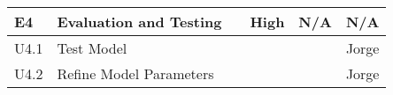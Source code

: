 \begin{longtable}[h!]{|p{1cm}|p{8.6cm}|p{1cm}|p{1.2cm}|p{1.2cm}|p{1.3cm}|}
    \hline
	\rowcolor{lightgray}\textbf{E4}   & \textbf{Evaluation and Testing} & \textbf{} & \textbf{High} & \textbf{N/A} & \textbf{N/A}\\
    \hline
    U4.1 & Test Model &  &  &  &Jorge \\
    \hline
    U4.2 & Refine Model Parameters &  &  & & Jorge\\

	\midrule

\end{longtable}